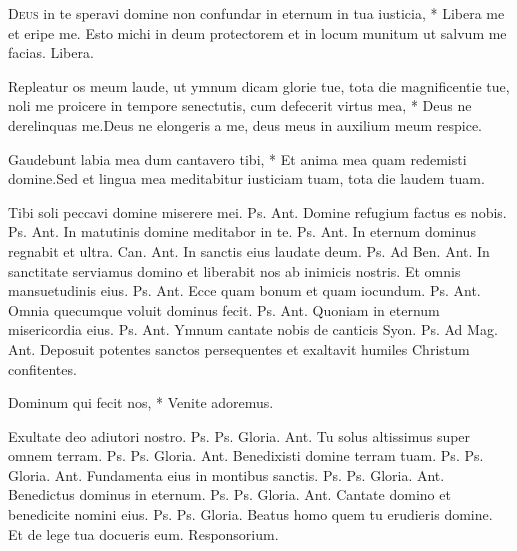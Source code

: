 \begin{multicols*}{2}
\lettrine[lines=2]{\zallmancaps \color{Red} D}{eus} \hypertarget{deus-in-te}{\label{deus-in-te}} in te speravi domine non confundar in eternum in tua iusticia, * Libera me et eripe me. \V Esto michi in deum protectorem et in locum munitum ut salvum me facias. Libera.
\begin{responsory}
{Repleatur os meum laude, ut ymnum dicam glorie tue, tota die magnificentie tue, noli me proicere in tempore senectutis, cum defecerit virtus mea, * Deus ne derelinquas me.}{Deus ne elongeris a me, deus meus in auxilium meum respice.}
\end{responsory}
\begin{responsory-doxology}
{Gaudebunt labia mea dum cantavero tibi, * Et anima mea quam redemisti domine.}{Sed et lingua mea meditabitur iusticiam tuam, tota die laudem tuam.}
\end{responsory-doxology}
 Tibi soli peccavi domine miserere mei. {\color{Red} Ps.}  {\color{Red} Ant.} Domine refugium factus es nobis. {\color{Red} Ps.}  {\color{Red} Ant.} In matutinis domine meditabor in te. {\color{Red} Ps.}  {\color{Red} Ant.} In eternum dominus regnabit et ultra. {\color{Red} Can.}  {\color{Red} Ant.} In sanctis eius laudate deum. {\color{Red} Ps.}  {\color{Red} Ad Ben. Ant.} In sanctitate serviamus domino et liberabit nos ab inimicis nostris.
 Et omnis mansuetudinis eius. {\color{Red} Ps.}  {\color{Red} Ant.} Ecce quam bonum et quam iocundum. {\color{Red} Ps.}  {\color{Red} Ant.} Omnia quecumque voluit dominus fecit. {\color{Red} Ps.}  {\color{Red} Ant.} Quoniam in eternum misericordia eius. {\color{Red} Ps.}  {\color{Red} Ant.} Ymnum cantate nobis de canticis Syon. {\color{Red} Ps.}  {\color{Red} Ad Mag. Ant.} Deposuit potentes sanctos persequentes et exaltavit humiles Christum confitentes.
{\color{Red} }
\par {}
\begin{invitatory}
{Dominum qui fecit nos, * Venite adoremus.}
\end{invitatory}
 Exultate deo adiutori nostro. {\color{Red} Ps.}  {\color{Red} Ps.}  Gloria. {\color{Red} Ant.} Tu solus altissimus super omnem terram. {\color{Red} Ps.}  {\color{Red} Ps.}  Gloria. {\color{Red} Ant.} Benedixisti domine terram tuam. {\color{Red} Ps.}  {\color{Red} Ps.}  Gloria. {\color{Red} Ant.} Fundamenta eius in montibus sanctis. {\color{Red} Ps.}  {\color{Red} Ps.}  Gloria. {\color{Red} Ant.} Benedictus dominus in eternum. {\color{Red} Ps.}  {\color{Red} Ps.}  Gloria. {\color{Red} Ant.} Cantate domino et benedicite nomini eius. {\color{Red} Ps.}  {\color{Red} Ps.}  Gloria. \V Beatus homo quem tu erudieris domine. \R Et de lege tua docueris eum. {\color{Red} Responsorium.}

\end{multicols*}
